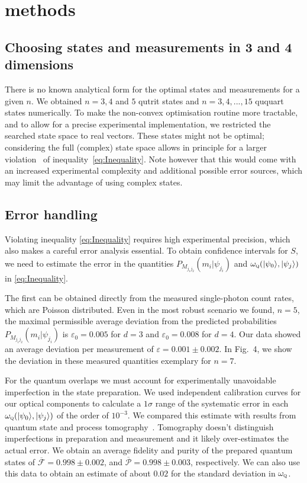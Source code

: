 \documentclass[aps,prl,floatfix,onecolumn,tightenlines,amsmath,amssymb,nofootinbib,12pt]{revtex4-2}
\newcommand{\ket}[1] {| #1 \rangle}
\newcommand{\ve} {\varepsilon}
\begin{document}
\section{methods}

\subsection{Choosing states and measurements in 3 and 4 dimensions}
There is no known analytical form for the optimal states and measurements for a given $n$. We obtained $n=3, 4$ and $5$ qutrit states and $n=3,4,...,15$ ququart states numerically. To make the non-convex optimisation routine more tractable, and to allow for a precise experimental implementation, we restricted the searched state space to real vectors. These states might not be optimal; considering the full (complex) state space allows in principle for a larger violation~\cite{Barrett2014,Branciard2014a} of inequality~\eqref{eq:Inequality}.
Note however that this would come with an increased experimental complexity and additional possible error sources, which may limit the advantage of using complex states.


\subsection{Error handling}
Violating inequality \eqref{eq:Inequality} requires high experimental precision, which also makes a careful error analysis essential. To obtain confidence intervals for $S$, we need to estimate the error in the quantities $P_{M_{j_1j_2}}(m_i | \psi_{j_i})$ and $\omega_{\textsc{q}}(\ket{\psi_0},\ket{\psi_j})$ in \eqref{eq:Inequality}. 

The first can be obtained directly from the measured single-photon count rates, which are Poisson distributed. Even in the most robust scenario we found, $n=5$, the maximal permissible average deviation from the predicted probabilities~\cite{Branciard2014a}  $P_{M_{j_1j_2}}(m_i | \psi_{j_i})$ is $\ve_0=0.005$ for $d=3$ and $\ve_0=0.008$ for $d=4$. Our data showed an average deviation per measurement of $\ve=0.001 \pm 0.002$. In Fig.~4, we show the deviation in these measured quantities exemplary for $n=7$.

For the quantum overlaps we must account for experimentally unavoidable imperfection in the state preparation. We used independent calibration curves for our optical components to calculate a $1\sigma$ range of the systematic error in each $\omega_{\textsc{q}}(\ket{\psi_0},\ket{\psi_j})$ of the order of $10^{-3}$. We compared this estimate with results from quantum state and process tomography~\cite{james2001mq}. Tomography doesn't distinguish imperfections in preparation and measurement and it likely over-estimates the actual error. We obtain an average fidelity and purity of the prepared quantum states of $\overline{\mathcal{F}}=0.998 \pm 0.002$, and $\overline{\mathcal{P}}=0.998 \pm 0.003$, respectively. We can also use this data to obtain an estimate of about $0.02$ for the standard deviation in $\omega_{\textsc{q}}$.
\end{document}
